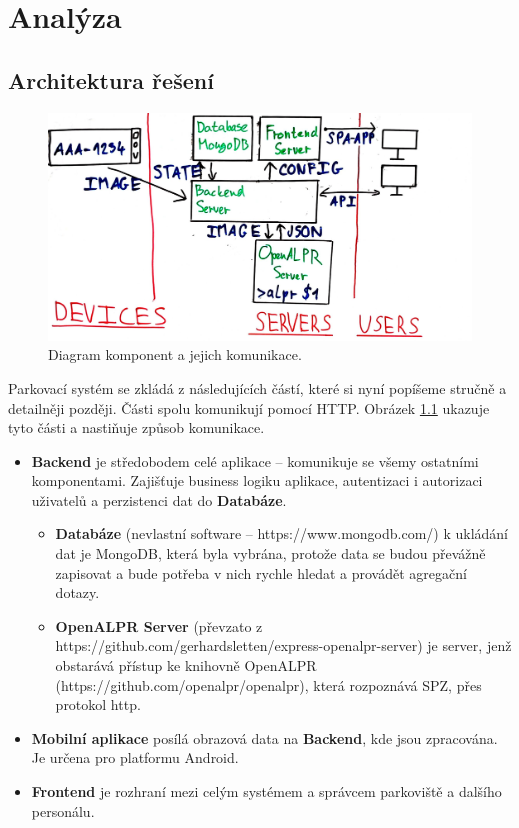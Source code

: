 
\chapter{Analýza} \label{analyza}

\section{Architektura řešení} \label{architektura_reseni}

\begin{figure} \centering
  \includegraphics[width=145mm]{../img/architecture_drawing.jpg}
  \caption{Diagram komponent a jejich komunikace.}
  \label{fig:architecture_drawing}
\end{figure}

Parkovací systém se zkládá z následujících částí, které si nyní popíšeme stručně a detailněji později.
Části spolu komunikují pomocí HTTP.
Obrázek \ref{fig:architecture_drawing} ukazuje tyto části a nastiňuje způsob komunikace.

\begin{itemize}
  \item \textbf{Backend} je středobodem celé aplikace -- komunikuje se všemy ostatními komponentami.
        Zajišťuje business logiku aplikace, autentizaci i autorizaci uživatelů a perzistenci dat do \textbf{Databáze}.
  \begin{itemize}
    \item \textbf{Databáze} (nevlastní software -- https://www.mongodb.com/) k ukládání dat je MongoDB, která byla vybrána, protože data se budou
          převážně zapisovat a bude potřeba v nich rychle hledat a provádět agregační dotazy.
    \item \textbf{OpenALPR Server} (převzato z https://github.com/gerhardsletten/express-openalpr-server) je server, jenž obstarává přístup
          ke knihovně OpenALPR (https://github.com/openalpr/openalpr), která rozpoznává SPZ, přes protokol http.
  \end{itemize}
  \item \textbf{Mobilní aplikace} posílá obrazová data na \textbf{Backend}, kde jsou zpracována. Je určena pro platformu Android.
  \item \textbf{Frontend} je rozhraní mezi celým systémem a správcem parkoviště a dalšího personálu.
\end{itemize}


